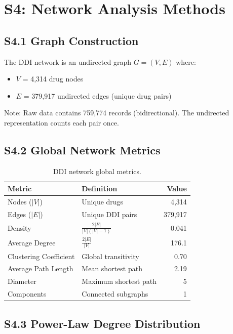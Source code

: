 \documentclass[11pt,a4paper]{article}
\begin{document}
\section{S4: Network Analysis Methods}

\subsection{S4.1 Graph Construction}

The DDI network is an undirected graph $G = (V, E)$ where:
\begin{itemize}
    \item $V$ = 4,314 drug nodes
    \item $E$ = 379,917 undirected edges (unique drug pairs)
\end{itemize}

Note: Raw data contains 759,774 records (bidirectional). The undirected representation counts each pair once.

\subsection{S4.2 Global Network Metrics}

\begin{table}[H]
\centering
\caption{DDI network global metrics.}
\begin{tabular}{@{}llr@{}}
\toprule
\textbf{Metric} & \textbf{Definition} & \textbf{Value} \\
\midrule
Nodes ($|V|$) & Unique drugs & 4,314 \\
Edges ($|E|$) & Unique DDI pairs & 379,917 \\
Density & $\frac{2|E|}{|V|(|V|-1)}$ & 0.041 \\
Average Degree & $\frac{2|E|}{|V|}$ & 176.1 \\
Clustering Coefficient & Global transitivity & 0.70 \\
Average Path Length & Mean shortest path & 2.19 \\
Diameter & Maximum shortest path & 5 \\
Components & Connected subgraphs & 1 \\
\bottomrule
\end{tabular}
\end{table}

\subsection{S4.3 Power-Law Degree Distribution}
\end{document}
